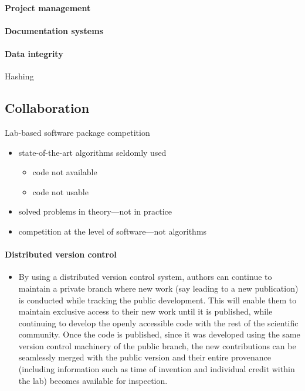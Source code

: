 \documentclass[ChapterTOCs,krantz2]{krantz} %
\begin{document}
\paragraph{ {\bf Project management}}

\paragraph{ {\bf Documentation systems}}

\paragraph{ {\bf Data integrity}}

Hashing


\subsection{Collaboration}

Lab-based software package competition

\begin{itemize}
\item  state-of-the-art algorithms seldomly used

\begin{itemize}
\item code not available
\item code not usable
\end{itemize}

\item solved problems in theory---not in practice
\item competition at the level of software---not algorithms
\end{itemize}

\paragraph{ {\bf Distributed version control}}

\begin{itemize}
\item By using a distributed version control system, authors can continue
to maintain a private branch where new work (say leading to a new
publication) is conducted while tracking the public development. This
will enable them to maintain exclusive access to their new work until
it is published, while continuing to develop the openly accessible
code with the rest of the scientific community. Once the code is published,
since it was developed using the same version control machinery of
the public branch, the new contributions can be seamlessly merged
with the public version and their entire provenance (including information
such as time of invention and individual credit within the lab) becomes
available for inspection.
\end{itemize}
\end{document}
